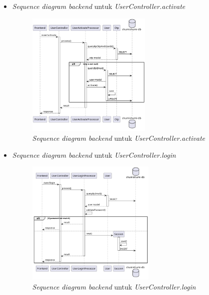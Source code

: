 \documentclass[a4paper]{article}
\begin{document}
\begin{enumerate}
\begin{enumerate}
\begin{itemize}
            \newpage
            \item \textit{Sequence diagram backend} untuk \textit{UserController.activate}
            \begin{figure}[h]
                \centering
                \includegraphics*[height=6cm]{diagram/sequence diagram/BE/user controller/activate/activate.png}
                \caption{\textit{Sequence diagram backend} untuk \textit{UserController.activate}}
            \end{figure}

            \item \textit{Sequence diagram backend} untuk \textit{UserController.login}
            \begin{figure}[h]
                \centering
                \includegraphics*[height=6cm]{diagram/sequence diagram/BE/user controller/login/login.png}
                \caption{\textit{Sequence diagram backend} untuk \textit{UserController.login}}
            \end{figure}


\end{itemize}
\end{enumerate}
\end{enumerate}
\end{document}
